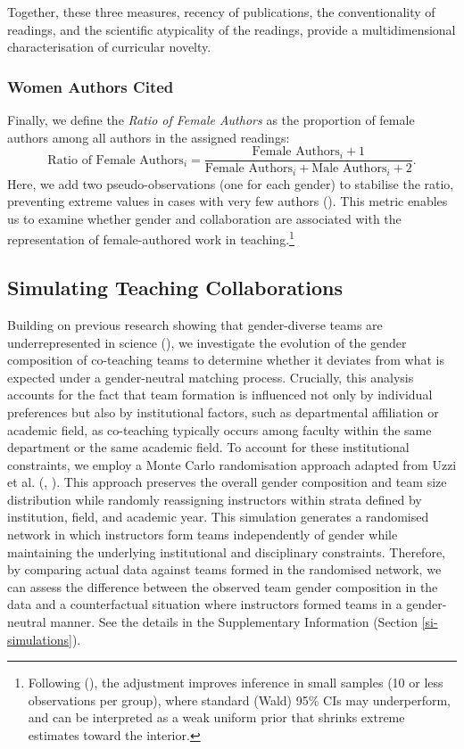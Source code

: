 \documentclass[
  british,
  11pt,
]{article}
\begin{document}
Together, these three measures, recency of publications, the conventionality of readings, and the scientific atypicality of the readings, provide a multidimensional characterisation of curricular novelty.

\subsubsection{Women Authors Cited}\label{women-authors-cited}

Finally, we define the \emph{Ratio of Female Authors} as the proportion of female authors among all authors in the assigned readings:
\[
  \text{Ratio of Female Authors}_i = \frac{\text{Female Authors}_i + 1} {\text{Female Authors}_i + \text{Male Authors}_i + 2}.
\]
Here, we add two pseudo-observations (one for each gender) to stabilise the ratio, preventing extreme values in cases with very few authors (). This metric enables us to examine whether gender and collaboration are associated with the representation of female-authored work in teaching.\footnote{
  Following (), the adjustment improves inference in small samples (10 or less observations per group), where standard (Wald) 95\% CIs may underperform, and can be interpreted as a weak uniform prior that shrinks extreme estimates toward the interior.}

\subsection{Simulating Teaching Collaborations}\label{simulating-teaching-collaborations}

Building on previous research showing that gender-diverse teams are underrepresented in science (), we investigate the evolution of the gender composition of co-teaching teams to determine whether it deviates from what is expected under a gender-neutral matching process. Crucially, this analysis accounts for the fact that team formation is influenced not only by individual preferences but also by institutional factors, such as departmental affiliation or academic field, as co-teaching typically occurs among faculty within the same department or the same academic field. To account for these institutional constraints, we employ a Monte Carlo randomisation approach adapted from Uzzi et al. (, ). This approach preserves the overall gender composition and team size distribution while randomly reassigning instructors within strata defined by institution, field, and academic year. This simulation generates a randomised network in which instructors form teams independently of gender while maintaining the underlying institutional and disciplinary constraints. Therefore, by comparing actual data against teams formed in the randomised network, we can assess the difference between the observed team gender composition in the data and a counterfactual situation where instructors formed teams in a gender-neutral manner. See the details in the Supplementary Information (Section \ref{si-simulations}).
\end{document}
